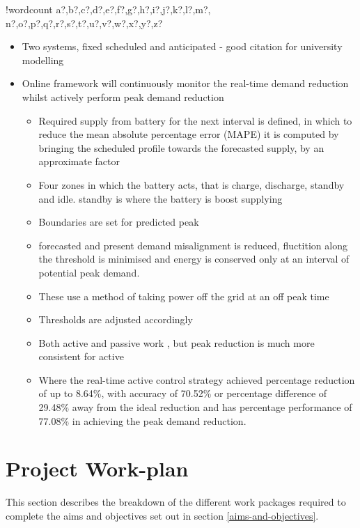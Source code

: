 \documentclass[10pt]{article}
\providecommand{\tightlist}{%
  \setlength{\itemsep}{0pt}\setlength{\parskip}{0pt}}
\newcounter{words}
\newenvironment{counted}{%
  \setcounter{words}{0}
  \SearchList!{wordcount}{\stepcounter{words}}
    {a?,b?,c?,d?,e?,f?,g?,h?,i?,j?,k?,l?,m?,
    n?,o?,p?,q?,r?,s?,t?,u?,v?,w?,x?,y?,z?}
  \UndoBoundary{'}
  \SearchOrder{p;}}{%
  \StopSearching}
\begin{document}
\begin{counted}
\begin{itemize}
\tightlist
\item
  Two systems, fixed scheduled and anticipated \cite{20164002874437} -
  good citation for university modelling
\item
  Online framework will continuously monitor the real-time demand
  reduction whilst actively perform peak demand reduction

  \begin{itemize}
  \tightlist
  \item
    Required supply from battery for the next interval is defined, in
    which to reduce the mean absolute percentage error (MAPE) it is
    computed by bringing the scheduled profile towards the forecasted
    supply, by an approximate factor
  \item
    Four zones in which the battery acts, that is charge, discharge,
    standby and idle. standby is where the battery is boost supplying
  \item
    Boundaries are set for predicted peak
  \item
    forecasted and present demand misalignment is reduced, fluctition
    along the threshold is minimised and energy is conserved only at an
    interval of potential peak demand.
  \item
    These use a method of taking power off the grid at an off peak time
  \item
    Thresholds are adjusted accordingly
  \item
    Both active and passive work , but peak reduction is much more
    consistent for active
  \item
    Where the real-time active control strategy achieved percentage
    reduction of up to 8.64\%, with accuracy of 70.52\% or percentage
    difference of 29.48\% away from the ideal reduction and has
    percentage performance of 77.08\% in achieving the peak demand
    reduction.
  \end{itemize}
\end{itemize}

\newpage

\section{Project Work-plan}\label{project-work-plan}

This section describes the breakdown of the different work packages
required to complete the aims and objectives set out in section
\ref{aims-and-objectives}.


\end{counted}
\end{document}
